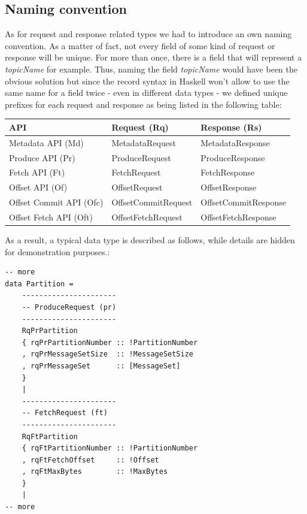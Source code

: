 \subsection{Naming convention}
As for request and response related types we had to introduce an own naming
convention. As a matter of fact, not every field of some kind of request or
response will be unique. For more than once, there is a field that will
represent a \textit{topicName} for example. Thus, naming the field \textit{
topicName} would have been the obvious solution but since the record syntax in
Haskell won't allow to use the same name for a field twice - even in different
data types - we defined unique prefixes for each request and response as being
listed in the following table:

\begin{table}[H]
\centering
\begin{tabular}{|l|l|l|}
\hline
\textbf{API}            & \textbf{Request (Rq)} & \textbf{Response (Rs)} \\ \hline
Metadata API (Md)       & MetadataRequest       & MetadataResponse       \\ \hline
Produce API (Pr)        & ProduceRequest        & ProduceResponse        \\ \hline
Fetch API (Ft)          & FetchRequest          & FetchResponse          \\ \hline
Offset API (Of)         & OffsetRequest         & OffsetResponse         \\ \hline
Offset Commit API (Ofc) & OffsetCommitRequest   & OffsetCommitResponse   \\ \hline
Offset Fetch API (Oft)  & OffsetFetchRequest    & OffsetFetchResponse    \\ \hline
\end{tabular}
\end{table}

As a result, a typical data type is described as follows, while details are
hidden for demonstration purposes.:

\begin{lstlisting}
-- more
data Partition =
    ----------------------
    -- ProduceRequest (pr)
    ----------------------
    RqPrPartition
    { rqPrPartitionNumber :: !PartitionNumber
    , rqPrMessageSetSize  :: !MessageSetSize
    , rqPrMessageSet      :: [MessageSet]
    }
    |
    ----------------------
    -- FetchRequest (ft)
    ----------------------
    RqFtPartition
    { rqFtPartitionNumber :: !PartitionNumber
    , rqFtFetchOffset     :: !Offset
    , rqFtMaxBytes        :: !MaxBytes
    }
    |
-- more
\end{lstlisting}


